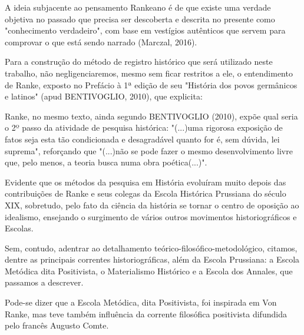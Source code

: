 A ideia subjacente ao pensamento Rankeano é de que existe uma verdade objetiva no passado que precisa ser descoberta e descrita no presente como "conhecimento verdadeiro", com base em vestígios autênticos que servem para comprovar o que está sendo narrado (Marczal, 2016).

Para a construção do método de registro histórico que será utilizado neste trabalho, não negligenciaremos, mesmo sem ficar restritos a ele, o entendimento de Ranke, exposto no Prefácio à 1ª edição de seu "História dos povos germânicos e latinos"  (apud BENTIVOGLIO, 2010), que explicita:


\noindent\begin{center}\mbox{\centering{}}\end{center}


Ranke, no mesmo texto, ainda segundo  BENTIVOGLIO (2010), expõe qual seria o 2º passo da atividade de pesquisa histórica: "(...)uma rigorosa exposição de fatos seja esta tão condicionada e desagradável quanto for é, sem dúvida, lei suprema", reforçando que "(...)não se pode fazer o mesmo desenvolvimento livre que, pelo menos, a teoria busca numa obra poética(...)".

Evidente que os métodos da pesquisa em História evoluíram muito depois das contribuições de Ranke e seus colegas da Escola Histórica Prussiana do século XIX, sobretudo, pelo fato da ciência  da história se tornar o centro de oposição ao idealismo, ensejando o surgimento de vários outros movimentos historiográficos e Escolas.

Sem, contudo, adentrar ao detalhamento teórico-filosófico-metodológico, citamos, dentre as principais correntes historiográficas, além da Escola Prussiana: a Escola Metódica dita Positivista, o Materialismo Histórico e a Escola dos Annales, que passamos a descrever.

Pode-se dizer que a Escola Metódica, dita Positivista, foi inspirada em Von Ranke, mas teve também influência da corrente filosófica positivista difundida pelo francês Augusto Comte.


